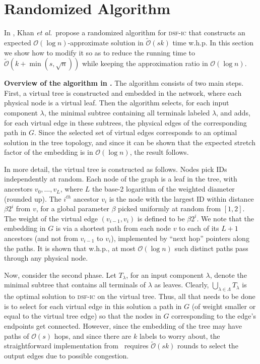 \documentclass[letterpaper,11pt]{article}
\newcommand{\BO}{\mathcal{O}}
\newcommand{\sO}{\tilde{\mathcal{O}}}
\newcommand{\Comp}{\lambda}
\newcommand{\sfic}{\textsc{dsf-ic}\xspace}
\renewcommand{\paragraph}[1]{\smallskip\par\noindent\textbf{#1}}
\begin{document}
\section{Randomized Algorithm}
\label{sec-alg2}
In \cite{KKMPT-12}, Khan \textit{et al.}\ propose a randomized
algorithm for \sfic that constructs an 
expected $\BO(\log n)$-approximate solution in $\tilde{\BO}(sk)$ time
w.h.p.
In this section we
show how to modify it so as to reduce the running time to
$\sO(k+\min(s,\sqrt n))$ while keeping the approximation ratio
in $\BO(\log n)$.

\paragraph{Overview of the algorithm in \cite{KKMPT-12}.}
The algorithm consists of two main steps. First, a
virtual tree is constructed and embedded in the network, where each
physical node is a virtual leaf.  Then the algorithm selects, for each
input component $\Comp$, the minimal subtree containing all terminals
labeled $\lambda$, and adds, for each virtual edge in these
subtrees, the physical edges of the corresponding path in $G$. Since
the selected set of virtual
edges corresponds to an optimal solution in the tree topology, and
since it can be shown that the expected stretch factor of the embedding is in
$\BO(\log n)$, the result follows.

In more detail, the virtual tree is constructed as follows.  Nodes
pick IDs independently at random.  Each node of the graph is a leaf in
the tree, with ancestors $v_0,\ldots,v_L$, where $L$ the base-2 logarithm of
the weighted diameter (rounded up). The $i^{th}$ ancestor $v_i$ is the
node with the largest ID within distance $\beta2^i$ from $v$, for a
global parameter $\beta$ picked uniformly at random from $[1,2]$. The
weight of the virtual edge $(v_{i-1},v_{i})$ is defined to be
$\beta2^i$.  We note that the embedding in $G$ is via a shortest path
from each node $v$ to each of its $L+1$ ancestors (and not from
$v_{i-1}$ to $v_i$), implemented by ``next hop'' pointers along the
paths.  It is shown that w.h.p., at most $\BO(\log n)$ such distinct
paths pass through any physical node.

Now, consider the second phase. Let $T_{\Comp}$, for an input component $\Comp$,  denote the minimal
subtree that contains all terminals of $\Comp$ as leaves.
Clearly, $\bigcup_{\Comp \in \Lambda}T_\Comp$ is the optimal solution
to \sfic on the virtual tree. Thus, all that needs to be done is to select
for each virtual edge in this solution a path in $G$ (of weight smaller or
equal to the virtual tree edge) so that the nodes in $G$ corresponding to the
edge's endpoints get connected. However, since the embedding of the
tree may have paths of $\BO(s)$ hops, and since there are $k$ labels
to worry about,  the straightforward
implementation from~\cite{KKMPT-12} requires $\sO(sk)$ rounds to
select the output edges due to possible
congestion.
\end{document}
